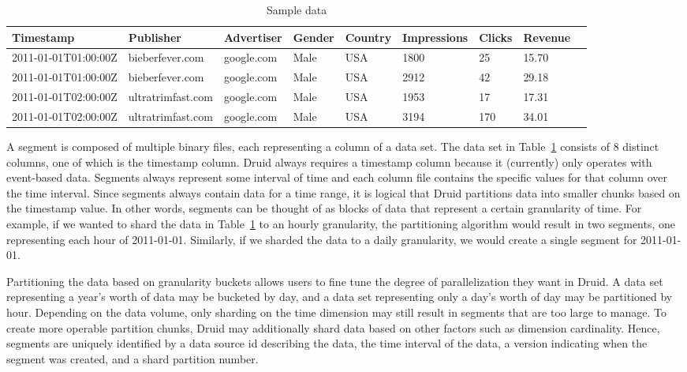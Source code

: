 \documentclass{vldb}
\begin{document}
\begin{table}
  \centering
  \caption{Sample data}
  \label{tab:sample_data}
    \begin{tabular}{| l | l | l | l | l | l | l | l | l |}
    \hline
    Timestamp & Publisher & Advertiser & Gender & Country & Impressions & Clicks & Revenue \\ \hline
    2011-01-01T01:00:00Z & bieberfever.com & google.com & Male & USA & 1800 & 25 & 15.70 \\ \hline
    2011-01-01T01:00:00Z & bieberfever.com & google.com & Male & USA & 2912 & 42 & 29.18 \\ \hline
    2011-01-01T02:00:00Z & ultratrimfast.com & google.com & Male & USA & 1953 & 17 & 17.31 \\ \hline
    2011-01-01T02:00:00Z & ultratrimfast.com & google.com & Male & USA & 3194 & 170 & 34.01 \\
    \hline
    \end{tabular}
\end{table}

A segment is composed of multiple binary files, each representing a
column of a data set. The data set in Table~\ref{tab:sample_data} consists of 8 distinct
columns, one of which is the timestamp column. Druid always requires a
timestamp column because it (currently) only operates with event-based
data. Segments always represent some interval of time and each column
file contains the specific values for that column over the time
interval. Since segments always contain data for a time range, it is
logical that Druid partitions data into smaller chunks based on the
timestamp value. In other words, segments can be thought of as blocks
of data that represent a certain granularity of time. For example, if
we wanted to shard the data in Table~\ref{tab:sample_data} to an hourly granularity, the
partitioning algorithm would result in two segments, one representing
each hour of 2011-01-01. Similarly, if we sharded the data to a daily
granularity, we would create a single segment for 2011-01-01.

Partitioning the data based on granularity buckets allows users to
fine tune the degree of parallelization they want in Druid. A data set
representing a year’s worth of data may be bucketed by day, and a data
set representing only a day’s worth of day may be partitioned by
hour. Depending on the data volume, only sharding on the time
dimension may still result in segments that are too large to
manage. To create more operable partition chunks, Druid may
additionally shard data based on other factors such as dimension
cardinality. Hence, segments are uniquely identified by a data source
id describing the data, the time interval of the data, a version
indicating when the segment was created, and a shard partition number.
\end{document}
